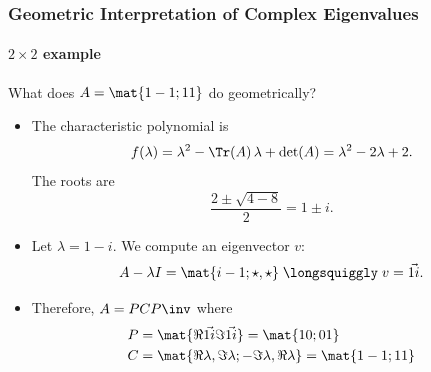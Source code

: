 
\begin{frame}
\frametitle{Geometric Interpretation of Complex Eigenvalues}
\framesubtitle{$2\times 2$ example}

What does $\displaystyle A = \mat{1 -1; 1 1}$ do geometrically?

\begin{webonly}
\begin{itemize}
\item The characteristic polynomial is
  \[ f(\lambda) = \lambda^2 - \Tr(A)\,\lambda + \det(A) 
  = \lambda^2 - 2\lambda + 2. \]
  The roots are
  \[ \frac{2\pm\sqrt{4-8}}2 = 1\pm i. \]
\item Let $\lambda = 1-i$.  We compute an eigenvector $v$:
  \[ A - \lambda I = \mat{i -1; \star, \star}
  \;\longsquiggly\; v = \vec{1 i}. \]
\item Therefore, $A=PCP\inv$ where
  \[\begin{aligned}
    \hss P &= \mat{\Re\vec{1 i} \Im\vec{1 i}} = \mat{1 0; 0 1} \\
     C &= \mat{\Re\lambda, \Im\lambda; -\Im\lambda, \Re\lambda}
       = \mat{1 -1; 1 1 } \hss 
     \end{aligned}\]
\end{itemize}
\end{webonly}
\end{frame}



